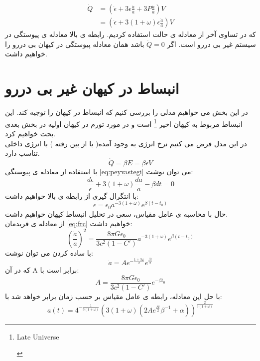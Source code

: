 \documentclass[12pt]{article}
\begin{document}
\begin{align}\label{eq:peyvastegi}
\dot Q&=(\dot\epsilon+3\epsilon\frac{\dot a}{a}+3P\frac{\dot a}{a})V \nonumber \\
		&=(\dot\epsilon+3(1+\omega)\epsilon\frac{\dot a}{a})V 
\end{align}
که در  تساوی آخر از معادله ی حالت استفاده کردیم.
 رابطه ی بالا معادله ی پیوستگی در سیستم غیر بی دررو است. اگر $\dot Q=0$ باشد همان معادله پیوستگی در کیهان بی دررو را خواهیم داشت.

\pagebreak
\section{انبساط در کیهان غیر بی دررو}
در این بخش می خواهیم مدلی را بررسی کنیم که انبساط در کیهان را توجیه کند. این انبساط مربوط به کیهان اخیر 
\footnote{
\begin{LTR}
Late Universe
\end{LTR}
}
است و در مورد تورم در کیهان اولیه در بخش بعدی بحث خواهیم کرد.\\
در این مدل فرض می کنیم نرخ انرژی به وجود آمده( یا از بین رفته ) با انرژی داخلی تناسب دارد. 
\begin{equation}
\dot Q=\beta E=\beta\epsilon V
\end{equation}
با استفاده از معادله ی پیوستگی 
\eqref{eq:peyvastegi}
می توان نوشت:
\begin{equation}\label{pey}
\frac{d\epsilon}{\epsilon}+3(1+\omega)\frac{da}{a}-\beta dt=0
\end{equation}
با انتگرال گیری از رابطه ی بالا خواهیم داشت:
\begin{equation}
\epsilon=\epsilon_0a^{-3(1+\omega)}e^{\beta(t-t_0)}
\end{equation}
حال با محاسبه ی عامل مقیاس، سعی در تحلیل انبساط کیهان خواهیم داشت.\\ از معادله ی فریدمان
\eqref{eq:frc}
خواهیم داشت:
\begin{equation}
(\frac{\dot a}{a})^2=\frac{8\pi G\epsilon_0}{3c^2(1-C')}a^{-3(1+\omega)}e^{\beta(t-t_0)}
\end{equation}
با ساده کردن می توان نوشت:
\begin{equation}
\dot a=Ae^{-\frac{1+3\omega}{2}}e^{\frac{\beta t}{2}}
\end{equation}
که در آن A برابر است با:
$$A=\frac{8\pi G\epsilon_0}{3c^2(1-C')}e^{-\beta t_0}$$
با حل این معادله، رابطه ی عامل مقیاس بر حسب زمان برابر خواهد شد با:
\begin{equation}
a(t)=4^{-\frac{1}{3(1+\omega)}}\left( 3(1+\omega)(2Ae^{\frac{\beta t}{2}}\beta^{-1}+\alpha) \right)^{\frac{2}{3(1+\omega)}}
\end{equation}
\end{document}
